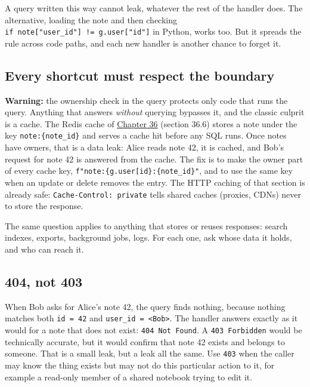 A query written this way cannot leak, whatever the rest of the handler does. The alternative, loading the note and then checking \texttt{if\ note{[}"user\_}\allowbreak{}\texttt{id"{]}\ !=}\allowbreak{}\texttt{\ g.}\allowbreak{}\texttt{user{[}"id"{]}} in Python, works too. But it spreads the rule across code paths, and each new handler is another chance to forget it.

\subsection*{Every shortcut must respect the boundary}\label{38-security:every-shortcut-must-respect-the-boundary}

\begin{warnbox}

\textbf{Warning:} the ownership check in the query protects only code that runs the query. Anything that answers \emph{without} querying bypasses it, and the classic culprit is a cache. The Redis cache of \hyperref[ch:36-scaling-load]{Chapter 36} (section 36.6) stores a note under the key \texttt{note:\{note\_id\}} and serves a cache hit before any SQL runs. Once notes have owners, that is a data leak: Alice reads note 42, it is cached, and Bob's request for note 42 is answered from the cache. The fix is to make the owner part of every cache key, \texttt{f"note:}\allowbreak{}\texttt{\{g.}\allowbreak{}\texttt{user{[}\textquotesingle{}id\textquotesingle{}{]}\}:}\allowbreak{}\texttt{\{note\_}\allowbreak{}\texttt{id\}"}, and to use the same key when an update or delete removes the entry. The HTTP caching of that section is already safe: \texttt{Cache-Control:\ private} tells shared caches (proxies, CDNs) never to store the response.

\end{warnbox}

\noindent{}The same question applies to anything that stores or reuses responses: search indexes, exports, background jobs, logs. For each one, ask whose data it holds, and who can reach it.

\subsection*{404, not 403}\label{38-security:404-not-403}

When Bob asks for Alice's note 42, the query finds nothing, because nothing matches both \texttt{id\ =\ 42} and \texttt{user\_id\ =\ \textless{}Bob\textgreater{}}. The handler answers exactly as it would for a note that does not exist: \texttt{404\ Not\ Found}. A \texttt{403\ Forbidden} would be technically accurate, but it would confirm that note 42 exists and belongs to someone. That is a small leak, but a leak all the same. Use \texttt{403} when the caller may know the thing exists but may not do this particular action to it, for example a read-only member of a shared notebook trying to edit it.

